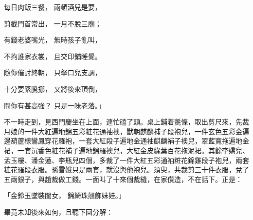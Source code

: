\begin{showcontents}{}
每日肉飯三餐，  兩頓酒兒是要，

剪截門首常出，  一月不脫三廟；

有錢老婆嘴光，  無時孩子亂叫，

不拘誰家衣裳，  且交印鋪睡覺。

隨你催討終朝，  只拏口兒支調，

十分要緊騰挪，  又將後來頂倒，

問你有甚高強？  只是一味老落。」

不一時走到，見西門慶坐在上面，連忙磕了頭。桌上鋪着氈條，取出剪尺來，先裁月娘的一件大紅遍地錦五彩粧花通袖襖，獸朝麒麟補子段袍兒，一件玄色五彩金遍邊葫蘆樣鸞鳳穿花羅袍，一套大紅段子遍地金通袖麒麟補子襖兒，翠藍寬拖遍地金裙，一套沉香色粧花補子遍地錦羅襖兒，大紅金皮綠葉百花拖泥裙。其餘李嬌兒、孟玉樓、潘金蓮、李瓶兒四個，多裁了一件大紅五彩通袖粧花錦雞段子袍兒，兩套粧花羅段衣服。孫雪娥只是兩套，就沒與他袍兒。須臾，共裁剪三十件衣服，兌了五兩銀子，與趙裁做工錢。一面叫了十來個裁縫，在家儹造，不在話下。正是：

「金鈴玉墜裝閨女，  錦綺珠翹飾妹娃。」

畢竟未知後來如何，且聽下回分解：




\end{showcontents}


